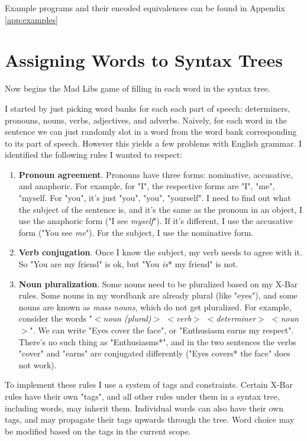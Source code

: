 \documentclass[runningheads]{llncs}
\begin{document}
Example programs and their encoded equivalences can be found in Appendix \ref{app:examples}

\section{Assigning Words to Syntax Trees}
Now begins the Mad Libs game of filling in each word in the syntax tree.

I started by just picking word banks for each each part of speech: determiners, pronouns, nouns, verbs, adjectives, and adverbs. Naively, for each word in the sentence we can just randomly slot in a word from the word bank corresponding to its part of speech. However this yields a few problems with English grammar. I identified the following rules I wanted to respect:
\begin{enumerate}
	\item \textbf{Pronoun agreement}. Pronouns have three forms: nominative, accusative, and anaphoric. For example, for "I", the respective forms are "I", "me", "myself. For "you", it's just "you", "you", "yourself". I need to find out what the subject of the sentence is, and it's the same as the pronoun in an object, I use the anaphoric form ("I see \textit{myself}"). If it's different, I use the accusative form ("You see \textit{me}"). For the subject, I use the nominative form.
	\item \textbf{Verb conjugation}. Once I know the subject, my verb needs to agree with it. So "You are my friend" is ok, but "You \textit{is}* my friend" is not.
	\item \textbf{Noun pluralization}. Some nouns need to be pluralized based on my X-Bar rules. Some nouns in my wordbank are already plural (like "eyes"), and some nouns are known as \textit{mass nouns}, which do not get pluralized. For example, consider the words "\textit{$<$noun (plural)$>$ $<$verb$>$ $<$determiner$>$ $<$noun$>$}".  We can write "Eyes cover the face", or  "Enthusiasm earns my respect". There's no such thing as "Enthusiasms*", and in the two sentences the verbs "cover" and "earns" are conjugated differently ("Eyes covers* the face" does not work).
\end{enumerate}
To implement these rules I use a system of tags and constraints. Certain X-Bar rules have their own "tags", and all other rules under them in a syntax tree, including words, may inherit them. Individual words can also have their own tags, and may propagate their tags upwards through the tree. Word choice may be modified based on the tags in the current scope.
\end{document}
